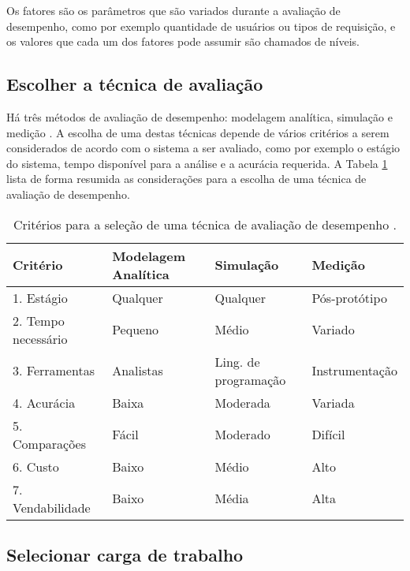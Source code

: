 Os fatores são os parâmetros que são variados durante a avaliação de desempenho, como por exemplo quantidade de usuários ou tipos de requisição, e os valores que cada um dos fatores pode assumir são chamados de níveis.

\subsection{Escolher a técnica de avaliação}

Há três métodos de avaliação de desempenho: modelagem analítica, simulação e medição \cite{jain1991art}. A escolha de uma destas técnicas depende de vários critérios a serem considerados de acordo com o sistema a ser avaliado, como por exemplo o estágio do sistema, tempo disponível para a análise e a acurácia requerida. A Tabela \ref{tab:analysistech} lista de forma resumida as considerações para a escolha de uma técnica de avaliação de desempenho.

\begin{table}
    \centering
    \begin{tabular}{llll}
        \toprule
        Critério            & Modelagem Analítica & Simulação            & Medição        \\
        \midrule
        1. Estágio          & Qualquer            & Qualquer             & Pós-protótipo  \\
        2. Tempo necessário & Pequeno             & Médio                & Variado        \\
        3. Ferramentas      & Analistas           & Ling. de programação & Instrumentação \\
        4. Acurácia         & Baixa               & Moderada             & Variada        \\
        5. Comparações      & Fácil               & Moderado             & Difícil        \\
        6. Custo            & Baixo               & Médio                & Alto           \\
        7. Vendabilidade    & Baixo               & Média                & Alta           \\
        \bottomrule
    \end{tabular}
    \caption{Critérios para a seleção de uma técnica de avaliação de desempenho \cite{jain1991art}.}
    \label{tab:analysistech}
\end{table}

\subsection{Selecionar carga de trabalho}

